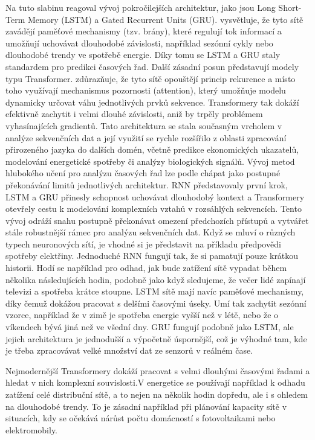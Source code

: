 Na tuto slabinu reagoval vývoj pokročilejších architektur, jako jsou Long Short-Term Memory (LSTM) a Gated Recurrent Units (GRU). \cite{Prince2023} vysvětluje, že tyto sítě zavádějí paměťové mechanismy (tzv. brány), které regulují tok informací a umožňují uchovávat dlouhodobé závislosti, například sezónní 
cykly nebo dlouhodobé trendy ve spotřebě energie. Díky tomu se LSTM a GRU staly standardem pro predikci časových řad.
Další zásadní posun představují modely typu Transformer.  \cite{Prince2023} zdůrazňuje, že tyto sítě opouštějí princip rekurence a místo toho využívají mechanismus pozornosti (attention), který umožňuje modelu dynamicky určovat váhu jednotlivých prvků sekvence. Transformery tak dokáží efektivně zachytit 
i velmi dlouhé závislosti, aniž by trpěly problémem vyhasínajících gradientů. Tato architektura se stala současným vrcholem v analýze sekvenčních dat a její využití se rychle rozšířilo z oblasti zpracování přirozeného jazyka do dalších domén, včetně predikce ekonomických ukazatelů, modelování energetické spotřeby či 
analýzy biologických signálů.
Vývoj metod hlubokého učení pro analýzu časových řad lze podle \cite{Prince2023} chápat jako postupné překonávání limitů jednotlivých architektur. RNN představovaly první krok, LSTM a GRU přinesly schopnost uchovávat dlouhodobý kontext a Transformery otevřely cestu k modelování komplexních vztahů v rozsáhlých 
sekvencích. Tento vývoj odráží snahu postupně překonávat omezení předchozích přístupů a vytvářet stále robustnější rámec pro analýzu sekvenčních dat.
Když se mluví o různých typech neuronových sítí, je vhodné si je představit na příkladu předpovědi spotřeby elektřiny. Jednoduché RNN fungují tak, že si pamatují pouze krátkou historii. Hodí se například 
pro odhad, jak bude zatížení sítě vypadat během několika následujících hodin, podobně jako když sledujeme, že večer lidé zapínají televizi a spotřeba krátce stoupne. LSTM sítě mají navíc paměťové mechanismy, díky čemuž dokážou pracovat s delšími časovými úseky. Umí tak zachytit sezónní vzorce, například že v zimě je spotřeba energie 
vyšší než v létě, nebo že o víkendech bývá jiná než ve všední dny. GRU fungují podobně jako LSTM, ale jejich  architektura je jednodušší a výpočetně úspornější, což je výhodné tam, kde je třeba zpracovávat velké množství dat  ze senzorů v reálném čase.

Nejmodernější Transformery dokáží pracovat s velmi dlouhými časovými řadami a hledat v nich komplexní souvislosti.V energetice se používají například k odhadu zatížení celé distribuční sítě, a to nejen na několik hodin dopředu, 
ale i s ohledem na dlouhodobé trendy. To je zásadní například při plánování kapacity sítě v situacích, kdy se očekává nárůst počtu domácností s fotovoltaikami nebo elektromobily.


